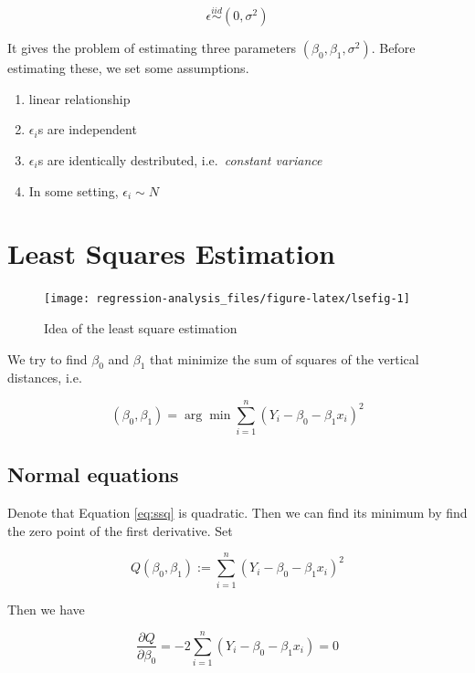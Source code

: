 \documentclass[]{book}
\providecommand{\tightlist}{%
  \setlength{\itemsep}{0pt}\setlength{\parskip}{0pt}}
\theoremstyle{definition}
\theoremstyle{definition}
\theoremstyle{definition}
\theoremstyle{remark}
\begin{document}
\[\epsilon \stackrel{iid}{\sim} (0, \sigma^2)\]

It gives the problem of estimating three parameters \((\beta_0, \beta_1, \sigma^2)\). Before estimating these, we set some assumptions.

\begin{enumerate}
\def\labelenumi{\arabic{enumi}.}
\tightlist
\item
  linear relationship
\item
  \(\epsilon_i\)s are independent
\item
  \(\epsilon_i\)s are identically destributed, i.e.~\emph{constant variance}
\item
  In some setting, \(\epsilon_i \sim N\)
\end{enumerate}

\hypertarget{least-squares-estimation}{%
\section{Least Squares Estimation}\label{least-squares-estimation}}

\begin{figure}[H]

{\centering \texttt{[image: regression-analysis\_files/figure-latex/lsefig-1]} 

}

\caption{Idea of the least square estimation}\label{fig:lsefig}
\end{figure}

We try to find \(\beta_0\) and \(\beta_1\) that minimize the sum of squares of the vertical distances, i.e.

\begin{equation}
  (\beta_0, \beta_1) = \arg\min \sum_{i = 1}^n (Y_i - \beta_0 - \beta_1 x_i)^2
  \label{eq:ssq}
\end{equation}

\hypertarget{normal-equations}{%
\subsection{Normal equations}\label{normal-equations}}

Denote that Equation \eqref{eq:ssq} is quadratic. Then we can find its minimum by find the zero point of the first derivative. Set

\[Q(\beta_0, \beta_1) := \sum_{i = 1}^n (Y_i - \beta_0 - \beta_1 x_i)^2\]

Then we have

\begin{equation}
  \frac{\partial Q}{\partial \beta_0} = -2 \sum_{i = 1}^n(Y_i - \beta_0 - \beta_1 x_i) = 0
  \label{eq:normbeta0}
\end{equation}
\end{document}
